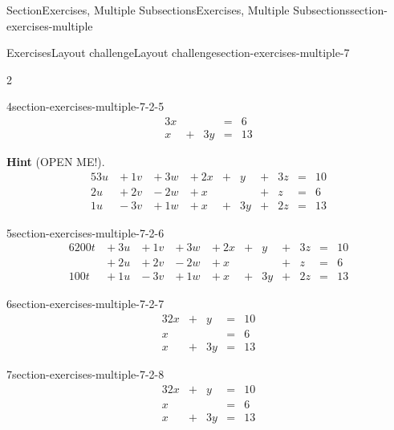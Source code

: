 \documentclass[twoside,10pt,]{article}
\newcommand{\blocktitlefont}{\relax}
\numberwithin{equation}{section}
\newcommand{\amp}{&}
\begin{document}
\begin{sectionptx}{Section}{Exercises, Multiple Subsections}{}{Exercises, Multiple Subsections}{}{}{section-exercises-multiple}
\begin{exercises-subsection}{Exercises}{Layout challenge}{}{Layout challenge}{}{}{section-exercises-multiple-7}
\begin{exercisegroupcol}{2}
\begin{divisionexerciseegcol}{4}{}{}{section-exercises-multiple-7-2-5}
\begin{alignat*}{3}
x  \amp       \amp    \amp {}={} \amp 6\\
x  \amp {}+{} \amp 3y \amp {}={} \amp 13
\end{alignat*}
\par\smallskip%
\noindent\textbf{\blocktitlefont Hint} (OPEN ME!).\hypertarget{section-exercises-multiple-7-2-5-2}{}\quad{}%
\begin{alignat*}{5}
3u \amp {}+{} 1v \amp {}+{} 3w \amp {}+{} 2x \amp {}+{} \amp  y \amp {}+{} \amp 3z \amp {}={} \amp 10\\
2u \amp {}+{} 2v \amp {}-{} 2w \amp {}+{} x  \amp       \amp    \amp {}+{} \amp  z \amp {}={} \amp 6\\
1u \amp {}-{} 3v \amp {}+{} 1w \amp {}+{} x  \amp {}+{} \amp 3y \amp {}+{} \amp 2z \amp {}={} \amp 13
\end{alignat*}
\end{divisionexerciseegcol}%
\begin{divisionexerciseegcol}{5}{}{}{section-exercises-multiple-7-2-6}%
%
\begin{alignat*}{6}
200t \amp {}+{} 3u \amp {}+{} 1v \amp {}+{} 3w \amp {}+{} 2x \amp {}+{} \amp  y \amp {}+{} \amp 3z \amp {}={} \amp 10\\
\amp {}+{} 2u \amp {}+{} 2v \amp {}-{} 2w \amp {}+{} x  \amp       \amp    \amp {}+{} \amp  z \amp {}={} \amp 6\\
100t \amp {}+{} 1u \amp {}-{} 3v \amp {}+{} 1w \amp {}+{} x  \amp {}+{} \amp 3y \amp {}+{} \amp 2z \amp {}={} \amp 13
\end{alignat*}
\end{divisionexerciseegcol}%
\begin{divisionexerciseegcol}{6}{}{}{section-exercises-multiple-7-2-7}%
%
\begin{alignat*}{3}
2x \amp {}+{} \amp  y \amp {}={} \amp 10\\
x  \amp       \amp    \amp {}={} \amp 6\\
x  \amp {}+{} \amp 3y \amp {}={} \amp 13
\end{alignat*}
\end{divisionexerciseegcol}%
\begin{divisionexerciseegcol}{7}{}{}{section-exercises-multiple-7-2-8}%
%
\begin{alignat*}{3}
2x \amp {}+{} \amp  y \amp {}={} \amp 10\\
x  \amp       \amp    \amp {}={} \amp 6\\
x  \amp {}+{} \amp 3y \amp {}={} \amp 13
\end{alignat*}
\end{divisionexerciseegcol}%

\end{exercisegroupcol}
\end{exercises-subsection}
\end{sectionptx}
\end{document}
